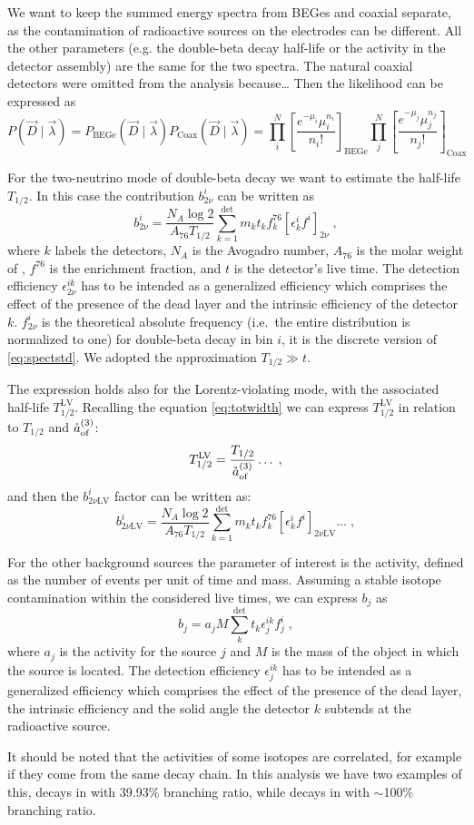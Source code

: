 We want to keep the summed energy spectra from BEGes and coaxial separate, as the contamination of radioactive sources on the electrodes can be different. All the other parameters (e.g. the double-beta decay half-life or the  activity in the detector assembly) are the same for the two spectra. The natural coaxial detectors were omitted from the analysis {\color{red}because\ldots} Then the likelihood can be expressed as
\[P(\vec{D}\mid\vec{\lambda})=P_\text{BEGe}(\vec{D}\mid\vec{\lambda})P_\text{Coax}(\vec{D}\mid\vec{\lambda})=\prod_i^N\left[\frac{e^{-\mu_i}\mu_i^{n_i}}{n_i!}\right]_\text{BEGe}\prod_j^N\left[\frac{e^{-\mu_j}\mu_j^{n_j}}{n_j!}\right]_\text{Coax}\]

\marginnote{$2\nbb$} For the two-neutrino mode of double-beta decay we want to estimate the half-life $T_{1/2}$. In this case the contribution $b_{2\nu}^i$ can be written as
\[b_{2\nu}^i=\frac{N_A\log2}{A_{76}T_{1/2}}\sum_{k=1}^\text{det}m_kt_kf^{76}_k\left[\epsilon^i_kf^i\right]_{2\nu}\;,\]
where $k$ labels the detectors, $N_A$ is the Avogadro number, $A_{76}$ is the molar weight of , $f^{76}$ is the enrichment fraction, and $t$ is the detector's live time. The detection efficiency $\epsilon_{2\nu}^{ik}$ has to be intended as a generalized efficiency which comprises the effect of the presence of the dead layer and the intrinsic efficiency of the detector $k$. $f_{2\nu}^i$ is the theoretical absolute frequency (i.e.~the entire distribution is normalized to one) for double-beta decay in bin $i$, it is the discrete version of \ref{eq:spectstd}. We adopted the approximation $T_{1/2}\gg t$.

The expression holds also for the Lorentz-violating mode, with the associated half-life $T_{1/2}^\text{LV}$. Recalling the equation \ref{eq:totwidth} we can express $T_{1/2}^\text{LV}$ in relation to $T_{1/2}$ and $\mathring{a}_\text{of}^{(3)}$:
\[T_{1/2}^\text{LV}=\frac{T_{1/2}}{\mathring{a}_\text{of}^{(3)}}\ldots\;,\]
and then the $b_{2\nu\text{LV}}^i$ factor can be written as:
\[b_{2\nu\text{LV}}^i=\frac{N_A\log2}{A_{76}T_{1/2}}\sum_{k=1}^\text{det}m_kt_kf^{76}_k\left[\epsilon^i_kf^i\right]_{2\nu\text{LV}}\ldots\;,\]

 For the other background sources the parameter of interest is the activity, defined as the number of events per unit of time and mass. Assuming a stable isotope contamination within the considered live times, we can express $b_j$ as
\[b_j=a_jM\sum_k^\text{det}t_k\epsilon_j^{ik}f_j^i\;,\]
where $a_j$ is the activity for the source $j$ and $M$ is the mass of the object in which the source is located. The detection efficiency $\epsilon_j^{ik}$ has to be intended as a generalized efficiency which comprises the effect of the presence of the dead layer, the intrinsic efficiency and the solid angle the detector $k$ subtends at the radioactive source.

It should be noted that the activities of some isotopes are correlated, for example if they come from the same decay chain. In this analysis we have two examples of this,  decays in  with 39.93\% branching ratio, while  decays in  with $\sim$100\% branching ratio.

